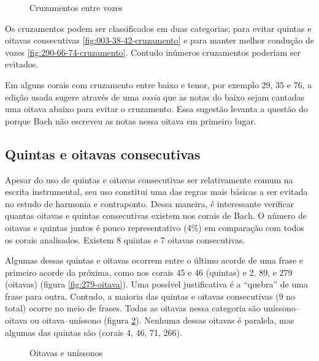 \begin{figure}
  \centering
  \caption{Cruzamentos entre vozes}
  \label{fig:coral-003}
\end{figure}

Os cruzamentos podem ser classificados em duas categorias; para evitar
quintas e oitavas consecutivas \ref{fig:003-38-42-cruzamento} e para
manter melhor condução de vozes \ref{fig:290-66-74-cruzamento}.
Contudo inúmeros cruzamentos poderiam ser evitados.

Em alguns corais com cruzamento entre baixo e tenor, por exemplo 29,
35 e 76, a edição usada sugere através de uma \textit{ossia} que as
notas do baixo sejam cantadas uma oitava abaixo para evitar o
cruzamento. Essa sugestão levanta a questão do porque Bach não
escreveu as notas nessa oitava em primeiro lugar.

\subsection{Quintas e oitavas consecutivas}
\label{sec:quintas-e-oitavas}

Apesar do uso de quintas e oitavas consecutivas ser relativamente
comum na escrita instrumental, seu uso constitui uma das regras mais
básicas a ser evitada no estudo de harmonia e contraponto. Dessa
maneira, é interessante verificar quantas oitavas e quintas
consecutivas existem nos corais de Bach. O número de oitavas e quintas
juntos é pouco representativo (4\%) em comparação com todos os corais
analisados. Existem 8 quintas e 7 oitavas consecutivas.

Algumas dessas quintas e oitavas ocorrem entre o último acorde de uma
frase e primeiro acorde da próxima, como nos corais 45 e 46 (quintas)
e 2, 89, e 279 (oitavas) (figura \ref{fig:279-oitava}). Uma possível
justificativa é a ``quebra'' de uma frase para outra. Contudo, a
maioria das quintas e oitavas consecutivas (9 no total) ocorre no meio
de frases. Todas as oitavas nessa categoria são uníssono--oitava ou
oitava--uníssono (figura \ref{fig:oitavas-e-unissonos}). Nenhuma
dessas oitavas é paralela, mas algumas das quintas são (corais 4, 46,
71, 266).

\begin{figure}
  \centering
  \qquad
  \qquad
  \caption{Oitavas e uníssonos}
  \label{fig:oitavas-e-unissonos}
\end{figure}

